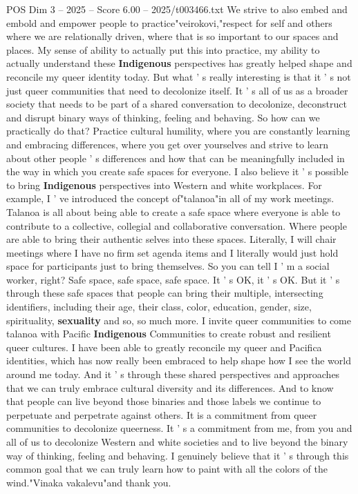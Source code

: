 \begin{textsample}{POS Dim 3 – 2025 – Score 6.00 – 2025/t003466.txt}
We strive to also embed and embold and empower people to practice"veirokovi,"respect for self and others where we are relationally driven, where that is so important to our spaces and places.
My sense of ability to actually put this into practice, my ability to actually understand these \textbf{Indigenous} perspectives has greatly helped shape and reconcile my queer identity today.
But what ' s really interesting is that it ' s not just queer communities that need to decolonize itself.
It ' s all of us as a broader society that needs to be part of a shared conversation to decolonize, deconstruct and disrupt binary ways of thinking, feeling and behaving.
So how can we practically do that?
Practice cultural humility, where you are constantly learning and embracing differences, where you get over yourselves and strive to learn about other people ' s differences and how that can be meaningfully included in the way in which you create safe spaces for everyone.
I also believe it ' s possible to bring \textbf{Indigenous} perspectives into Western and white workplaces.
For example, I ' ve introduced the concept of"talanoa"in all of my work meetings.
Talanoa is all about being able to create a safe space where everyone is able to contribute to a collective, collegial and collaborative conversation.
Where people are able to bring their authentic selves into these spaces.
Literally, I will chair meetings where I have no firm set agenda items and I literally would just hold space for participants just to bring themselves.
So you can tell I ' m a social worker, right?
Safe space, safe space, safe space.
It ' s OK, it ' s OK.
But it ' s through these safe spaces that people can bring their multiple, intersecting identifiers, including their age, their class, color, education, gender, size, spirituality, \textbf{sexuality} and so, so much more.
I invite queer communities to come talanoa with Pacific \textbf{Indigenous} Communities to create robust and resilient queer cultures.
I have been able to greatly reconcile my queer and Pacifica identities, which has now really been embraced to help shape how I see the world around me today.
And it ' s through these shared perspectives and approaches that we can truly embrace cultural diversity and its differences.
And to know that people can live beyond those binaries and those labels we continue to perpetuate and perpetrate against others.
It is a commitment from queer communities to decolonize queerness.
It ' s a commitment from me, from you and all of us to decolonize Western and white societies and to live beyond the binary way of thinking, feeling and behaving.
I genuinely believe that it ' s through this common goal that we can truly learn how to paint with all the colors of the wind."Vinaka vakalevu"and thank you.

\end{textsample}
